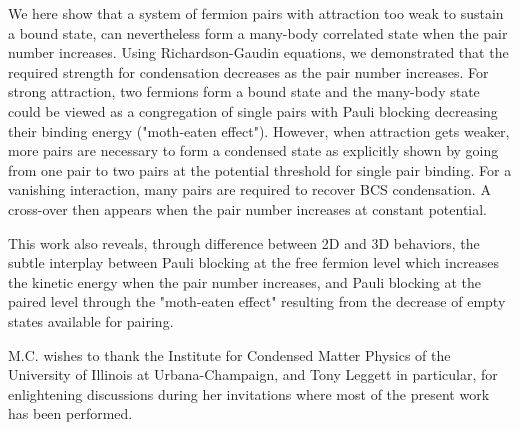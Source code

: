 \documentclass[5p,twocolumn]{elsarticle}
\begin{document}
We here show that a system of fermion pairs with attraction too weak to sustain a bound state, can nevertheless form a many-body correlated state when the pair number increases.  Using Richardson-Gaudin equations, we demonstrated that the required strength for condensation decreases as the pair number increases.  For strong attraction, two fermions form a bound state and the many-body state could be viewed as a congregation of single pairs with Pauli blocking decreasing their binding energy ("moth-eaten effect").  However, when attraction gets weaker, more pairs are necessary to form a condensed state as explicitly shown by going from one pair to two pairs at the potential threshold for single pair binding.  For a vanishing interaction, many pairs are required to recover BCS condensation.   A cross-over then appears when the pair number increases at constant potential.

 This work also reveals, through difference between 2D and 3D behaviors, the subtle interplay between Pauli blocking at the free fermion level which increases the kinetic energy when the pair number increases, and Pauli blocking at the paired level through the "moth-eaten effect" resulting from the decrease of empty states available for pairing.

M.C. wishes to thank the Institute for Condensed Matter Physics of the University of Illinois at
Urbana-Champaign, and Tony Leggett in particular, for enlightening discussions during her invitations  where most of the present work has been
performed. 
 
\end{document}
